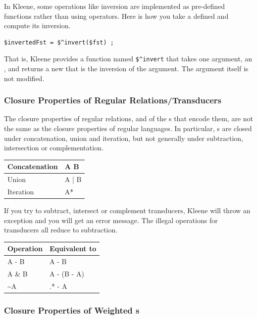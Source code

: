In Kleene, some operations like inversion are implemented as pre-defined
functions rather than using operators.  Here is how you take a defined
\fst{} and compute its inversion.

\begin{Verbatim}
$invertedFst = $^invert($fst) ;
\end{Verbatim}

\noindent
That is, Kleene provides a function named \verb!$^invert! that takes one argument, an \fst, and
returns a new \fst{} that is the inversion of the argument.  The argument itself is not modified. 

\subsubsection{Closure Properties of Regular Relations/Transducers}

The closure properties of regular relations, and of the \fst{}s that encode them, are not
the same as the closure properties of regular languages.  In particular, \fst{}s are closed
under concatenation, union and iteration, but not generally under subtraction, intersection
or complementation.

\vspace{4mm}

\begin{tabular}{|l|l|}
\hline
Concatenation 	& A B \\
\hline
Union         	& A | B \\
\hline
Iteration	  	& A*\\
\hline
\end{tabular}

\vspace{4mm}

\noindent
If you try to subtract, intersect or complement transducers, Kleene will
throw an exception and you will get an error message.
The illegal operations for transducers all reduce to subtraction.

\vspace{4mm}

\begin{tabular}{|l|l|}
\hline
Operation & Equivalent to \\
\hline
A - B  &  A - B \\
A \& B  &  A - (B - A)\\
\~{}A   &  .* - A\\
\hline
\end{tabular}

\subsubsection{Closure Properties of Weighted \fsm{}s}


